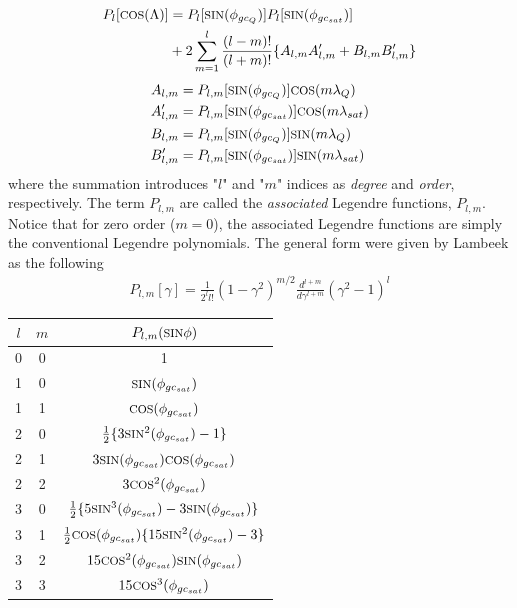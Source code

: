 \begin{multicols}{2}
\begin{gather}
    \begin{split}
        P_l[\text{\footnotesize{COS}}(\Lambda)] &= P_l[\text{\footnotesize{SIN}}(\phi_{gc_{Q}})]P_l[\text{\footnotesize{SIN}}(\phi_{gc_{sat}})]\\
                    &+2\sum_{m=1}^{l}\frac{(l-m)!}{(l+m)!}\{A_{l,m}A'_{l,m}+B_{l,m}B'_{l,m}\}
    \end{split}
\end{gather}
\begin{gather*}
    \begin{split}
        A_{l,m} &= P_{l,m}[\text{\footnotesize{SIN}}(\phi_{gc_{Q}})]\text{\footnotesize{COS}}(m\lambda_Q)\\
        A'_{l,m} &= P_{l,m}[\text{\footnotesize{SIN}}(\phi_{gc_{sat}})]\text{\footnotesize{COS}}(m\lambda_{sat})\\
        B_{l,m} &= P_{l,m}[\text{\footnotesize{SIN}}(\phi_{gc_{Q}})]\text{\footnotesize{SIN}}(m\lambda_Q)\\
        B'_{l,m} &= P_{l,m}[\text{\footnotesize{SIN}}(\phi_{gc_{sat}})]\text{\footnotesize{SIN}}(m\lambda_{sat})\\
    \end{split}
\end{gather*}
where the summation introduces "$l$" and "$m$" indices as \textit{degree} and \textit{order}, respectively. The term $P_{l,m}$ are called the \textit{associated} Legendre functions, $P_{l,m}$. Notice that for zero order ($m=0$), the associated Legendre functions are simply the conventional Legendre polynomials. The general form were given by Lambeek as the following
\begin{gather*}
    P_{l,m}[\gamma] = \frac{1}{2^ll!}(1-\gamma^2)^{m/2}\frac{d^{l+m}}{d\gamma^{l+m}}(\gamma^2-1)^l
\end{gather*}

\begin{center}
    \begin{tabular}{ccc}
        $l$ & $m$ & $P_{l,m}(\text{\footnotesize{SIN}}\phi)$ \\[0.1cm]
        \hline\hline
        0   & 0   & 1 \\[0.1cm]
        \hline
        1   & 0   & $\text{\footnotesize{SIN}}(\phi_{gc_{sat}})$ \\[0.1cm]
        1   & 1   & $\text{\footnotesize{COS}}(\phi_{gc_{sat}})$ \\[0.1cm]
        \hline
        2   & 0   & $\frac{1}{2}\{3\text{\footnotesize{SIN}}^2(\phi_{gc_{sat}})-1\}$ \\[0.1cm]
        2   & 1   & $3\text{\footnotesize{SIN}}(\phi_{gc_{sat}})\text{\footnotesize{COS}}(\phi_{gc_{sat}})$ \\[0.1cm]
        2   & 2   & $3\text{\footnotesize{COS}}^2(\phi_{gc_{sat}})$ \\[0.1cm]
        \hline
        3   & 0   & $\frac{1}{2}\{5\text{\footnotesize{SIN}}^3(\phi_{gc_{sat}})-3\text{\footnotesize{SIN}}(\phi_{gc_{sat}})\}$ \\[0.1cm]
        3   & 1   & $\frac{1}{2}\text{\footnotesize{COS}}(\phi_{gc_{sat}})\{15\text{\footnotesize{SIN}}^2(\phi_{gc_{sat}})-3\}$ \\[0.1cm]
        3   & 2   & $15\text{\footnotesize{COS}}^2(\phi_{gc_{sat}})\text{\footnotesize{SIN}}(\phi_{gc_{sat}})$ \\[0.1cm]
        3   & 3   & $15\text{\footnotesize{COS}}^3(\phi_{gc_{sat}})$ \\[0.1cm]
        \hline\hline
    \end{tabular}
\end{center}



\end{multicols}
